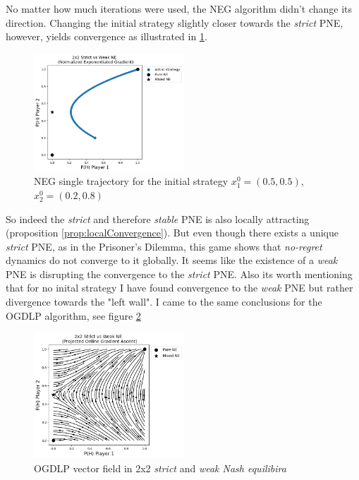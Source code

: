 No matter how much iterations were used, the NEG algorithm didn't change its direction. Changing the initial strategy slightly closer towards the \textit{strict} PNE, however, yields convergence as illustrated in \ref{fig:Weak3}. 

\begin{figure}[H]
    \centering
    \includegraphics[width=0.5\textwidth]{logos/Weak3.png}
    \caption{NEG single trajectory for the initial strategy $x_{1}^{0} = (0.5,0.5)$, $x_{2}^{0} = (0.2,0.8)$}
    \label{fig:Weak3}
\end{figure}

So indeed the \textit{strict} and therefore \textit{stable} PNE is also locally attracting (proposition \ref{prop:localConvergence}). But even though there exists a unique \textit{strict} PNE, as in the Prisoner's Dilemma, this game shows that \textit{no-regret} dynamics do not converge to it globally. It seems like the existence of a \textit{weak} PNE is disrupting the convergence to the \textit{strict} PNE. Also its worth mentioning that for no inital strategy I have found convergence to the \textit{weak} PNE but rather divergence towards the "left wall". I came to the same conclusions for the OGDLP algorithm, see figure \ref{fig:Weak5}

\begin{figure}[H]
    \centering
    \includegraphics[width=0.5\textwidth]{logos/Weak5.png}
    \caption{OGDLP vector field in 2x2 \textit{strict} and \textit{weak Nash equilibira}}
    \label{fig:Weak5}
\end{figure}


